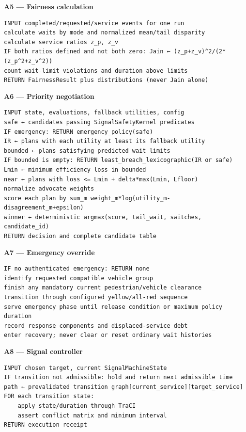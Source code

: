 \documentclass[
  english,
  11pt,
  a4paper,
]{article}
\newcounter{none} %
\begin{document}
\textbf{A5 --- Fairness calculation}

\begin{verbatim}
INPUT completed/requested/service events for one run
calculate waits by mode and normalized mean/tail disparity
calculate service ratios z_p, z_v
IF both ratios defined and not both zero: Jain ← (z_p+z_v)^2/(2*(z_p^2+z_v^2))
count wait-limit violations and duration above limits
RETURN FairnessResult plus distributions (never Jain alone)
\end{verbatim}

\textbf{A6 --- Priority negotiation}

\begin{verbatim}
INPUT state, evaluations, fallback utilities, config
safe ← candidates passing SignalSafetyKernel predicates
IF emergency: RETURN emergency_policy(safe)
IR ← plans with each utility at least its fallback utility
bounded ← plans satisfying predicted wait limits
IF bounded is empty: RETURN least_breach_lexicographic(IR or safe)
Lmin ← minimum efficiency loss in bounded
near ← plans with loss <= Lmin + delta*max(Lmin, Lfloor)
normalize advocate weights
score each plan by sum_m weight_m*log(utility_m-disagreement_m+epsilon)
winner ← deterministic argmax(score, tail_wait, switches, candidate_id)
RETURN decision and complete candidate table
\end{verbatim}

\textbf{A7 --- Emergency override}

\begin{verbatim}
IF no authenticated emergency: RETURN none
identify requested compatible vehicle group
finish any mandatory current pedestrian/vehicle clearance
transition through configured yellow/all-red sequence
serve emergency phase until release condition or maximum policy duration
record response components and displaced-service debt
enter recovery; never clear or reset ordinary wait histories
\end{verbatim}

\textbf{A8 --- Signal controller}

\begin{verbatim}
INPUT chosen target, current SignalMachineState
IF transition not admissible: hold and return next admissible time
path ← prevalidated transition graph[current_service][target_service]
FOR each transition state:
    apply state/duration through TraCI
    assert conflict matrix and minimum interval
RETURN execution receipt
\end{verbatim}
\end{document}

